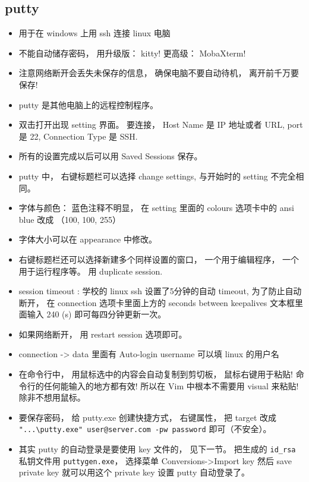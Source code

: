 \subsection{putty}
\begin{itemize}
\item 用于在 windows 上用 ssh 连接 linux 电脑
\item 不能自动储存密码， 用升级版： kitty! 更高级： MobaXterm!
\item 注意网络断开会丢失未保存的信息， 确保电脑不要自动待机， 离开前千万要保存!
\item putty 是其他电脑上的远程控制程序。
\item 双击打开出现 setting 界面。 要连接， Host Name 是 IP 地址或者 URL, port 是 22, Connection Type 是 SSH.
\item 所有的设置完成以后可以用 Saved Sessions 保存。
\item putty 中， 右键标题栏可以选择 change settings, 与开始时的 setting 不完全相同。
\item 字体与颜色： 蓝色注释不明显， 在 setting 里面的 colours 选项卡中的 ansi blue 改成 （100, 100, 255）
\item 字体大小可以在 appearance 中修改。
\item 右键标题栏还可以选择新建多个同样设置的窗口， 一个用于编辑程序， 一个用于运行程序等。 用 duplicate session.
\item session timeout : 学校的 linux ssh 设置了5分钟的自动 timeout, 为了防止自动断开， 在 connection 选项卡里面上方的 seconds between keepalives 文本框里面输入 240 (s) 即可每四分钟更新一次。
\item 如果网络断开， 用 restart session 选项即可。
\item connection -> data 里面有 Auto-login username 可以填 linux 的用户名
\item 在命令行中， 用鼠标选中的内容会自动复制到剪切板， 鼠标右键用于粘贴! 命令行的任何能输入的地方都有效! 所以在 Vim 中根本不需要用 visual 来粘贴! 除非不想用鼠标。
\item 要保存密码， 给 putty.exe 创建快捷方式， 右键属性， 把 target 改成 \verb`"...\putty.exe" user@server.com -pw password` 即可（不安全）。
\item 其实 putty 的自动登录是要使用 key 文件的， 见下一节。 把生成的 \verb`id_rsa` 私钥文件用 \verb`puttygen.exe`， 选择菜单 Conversions->Import key 然后 save private key 就可以用这个 private key 设置 putty 自动登录了。
\end{itemize}

